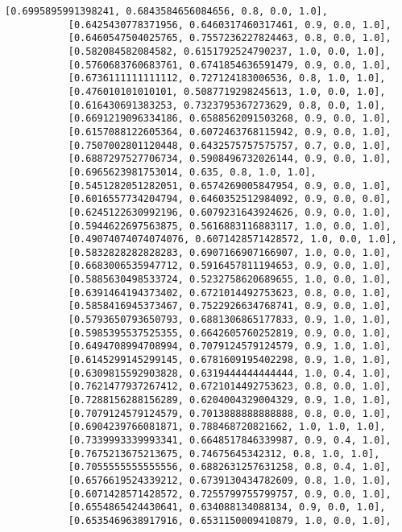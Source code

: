 \documentclass[11pt]{article}
\begin{document}
\begin{Verbatim}[commandchars=\\\{\}]
           [0.6995895991398241, 0.6843584656084656, 0.8, 0.0, 1.0],
           [0.6425430778371956, 0.6460317460317461, 0.9, 0.0, 1.0],
           [0.6460547504025765, 0.7557236227824463, 0.8, 0.0, 1.0],
           [0.582084582084582, 0.6151792524790237, 1.0, 0.0, 1.0],
           [0.5760683760683761, 0.6741854636591479, 0.9, 0.0, 1.0],
           [0.6736111111111112, 0.727124183006536, 0.8, 1.0, 1.0],
           [0.476010101010101, 0.5087719298245613, 1.0, 0.0, 1.0],
           [0.616430691383253, 0.7323795367273629, 0.8, 0.0, 1.0],
           [0.6691219096334186, 0.6588562091503268, 0.9, 0.0, 1.0],
           [0.6157088122605364, 0.6072463768115942, 0.9, 0.0, 1.0],
           [0.7507002801120448, 0.6432575757575757, 0.7, 0.0, 1.0],
           [0.6887297527706734, 0.5908496732026144, 0.9, 0.0, 1.0],
           [0.6965623981753014, 0.635, 0.8, 1.0, 1.0],
           [0.5451282051282051, 0.6574269005847954, 0.9, 0.0, 1.0],
           [0.6016557734204794, 0.6460352512984092, 0.9, 0.0, 0.0],
           [0.6245122630992196, 0.6079231643924626, 0.9, 0.0, 1.0],
           [0.5944622697563875, 0.5616883116883117, 1.0, 0.0, 1.0],
           [0.49074074074074076, 0.6071428571428572, 1.0, 0.0, 1.0],
           [0.5832828282828283, 0.6907166907166907, 1.0, 0.0, 1.0],
           [0.6683006535947712, 0.5916457811194653, 0.9, 0.0, 1.0],
           [0.5885630498533724, 0.5232758620689655, 1.0, 0.0, 1.0],
           [0.6391464194373402, 0.6721014492753623, 0.8, 0.0, 1.0],
           [0.5858416945373467, 0.7522926634768741, 0.9, 0.0, 1.0],
           [0.5793650793650793, 0.6881306865177833, 0.9, 1.0, 1.0],
           [0.5985395537525355, 0.6642605760252819, 0.9, 0.0, 1.0],
           [0.6494708994708994, 0.7079124579124579, 0.9, 1.0, 1.0],
           [0.6145299145299145, 0.6781609195402298, 0.9, 1.0, 1.0],
           [0.6309815592903828, 0.6319444444444444, 1.0, 0.4, 1.0],
           [0.7621477937267412, 0.6721014492753623, 0.8, 0.0, 1.0],
           [0.7288156288156289, 0.6204004329004329, 0.9, 1.0, 1.0],
           [0.7079124579124579, 0.7013888888888888, 0.8, 0.0, 1.0],
           [0.6904239766081871, 0.788468720821662, 1.0, 1.0, 1.0],
           [0.7339993339993341, 0.6648517846339987, 0.9, 0.4, 1.0],
           [0.7675213675213675, 0.74675645342312, 0.8, 1.0, 1.0],
           [0.7055555555555556, 0.6882631257631258, 0.8, 0.4, 1.0],
           [0.6576619524339212, 0.6739130434782609, 0.8, 1.0, 1.0],
           [0.6071428571428572, 0.7255799755799757, 0.9, 0.0, 1.0],
           [0.6554865424430641, 0.634088134088134, 0.9, 0.0, 1.0],
           [0.6535469638917916, 0.6531150009410879, 1.0, 0.0, 1.0],

\end{Verbatim}
\end{document}
